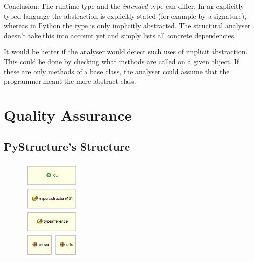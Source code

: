 \documentclass[12pt,halfparskip,DIV11,BCOR10mm]{scrreprt}
\begin{document}
Conclusion: The runtime type and the \emph{intended} type can differ. In an explicitly typed language the abstraction is explicitly stated (for example by a signature), whereas in Python the type is only implicitly abstracted. The structural analyser doesn't take this into account yet and simply lists all concrete dependencies.

It would be better if the analyser would detect such uses of implicit abstraction. This could be done by checking what methods are called on a given object. If these are only methods of a base class, the analyser could assume that the programmer meant the more abstract class.


\chapter{Quality Assurance}



\section{PyStructure's Structure}

\begin{figure}
    \vspace{-0.7cm}
    \includegraphics[width=3cm]{architecture/parts}
    \vspace{-1.5cm}
\end{figure}
\end{document}
